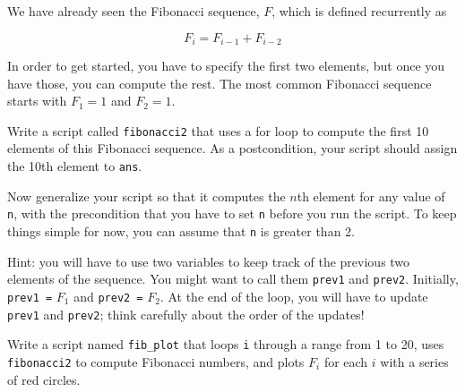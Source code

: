 \begin{ex}
\label{fib2}

We have already seen the Fibonacci sequence, $F$, which
is defined recurrently as

\[ F_{i} = F_{i-1} + F_{i-2} \]

In order to get started, you have to specify the first two
elements, but once you have those, you can compute the rest.
The most common Fibonacci sequence starts with $F_1 = 1$ and $F_2 = 1$.

Write a script called {\tt fibonacci2} that uses a for loop
to compute the first 10 elements of this Fibonacci sequence.
As a postcondition, your script should assign the 10th element to
{\tt ans}.

Now generalize your script so that it computes the $n$th element
for any value of {\tt n}, with the precondition that you have to
set {\tt n} before you run the script. To keep things simple for
now, you can assume that {\tt n} is greater than 2.

Hint: you will have to use two variables to keep track of the
previous two elements of the sequence. You might want to call
them {\tt prev1} and {\tt prev2}. Initially, {\tt prev1 =} $F_1$
and {\tt prev2 =} $F_2$. At the end of the loop, you will have
to update {\tt prev1} and {\tt prev2}; think carefully about the
order of the updates!
\end{ex}


\begin{ex}
\label{fib_plot}

Write a script named {\tt fib\_plot} that loops {\tt i}
through a range from 1 to 20, uses {\tt fibonacci2} to compute
Fibonacci numbers, and plots $F_i$ for each $i$ with a series of red
circles.

\end{ex}

